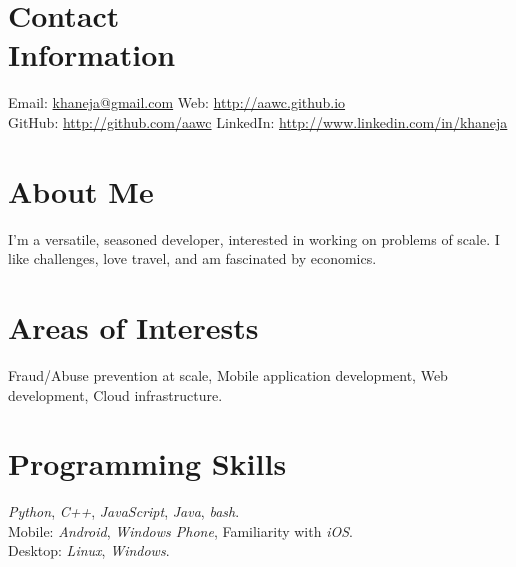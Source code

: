 \documentclass[margin,line]{resume}
\begin{document}
	\begin{resume}

	\section{\mysidestyle Contact\\Information}

	Email: \href{mailto:khaneja@gmail.com}{khaneja@gmail.com} \hfill Web: \href{http://aawc.github.io}{http://aawc.github.io}\\
	GitHub: \href{http://github.com/aawc}{http://github.com/aawc} \hfill LinkedIn: \href{http://www.linkedin.com/in/khaneja}{http://www.linkedin.com/in/khaneja}

	\section{\mysidestyle About Me}
	I'm a versatile, seasoned developer, interested in working on problems of scale. I like challenges, love travel, and am fascinated by economics.

	\section{\mysidestyle Areas of Interests}
	Fraud/Abuse prevention at scale, Mobile application development, Web development, Cloud infrastructure.

	\section{\mysidestyle Programming Skills}
    \textit{Python}, \textit{C++}, \textit{JavaScript}, \textit{Java}, \textit{bash}.\\
	Mobile: \textit{Android}, \textit{Windows Phone}, Familiarity with \textit{iOS}.\\
	Desktop: \textit{Linux}, \textit{Windows}.


\end{resume}
\end{document}
